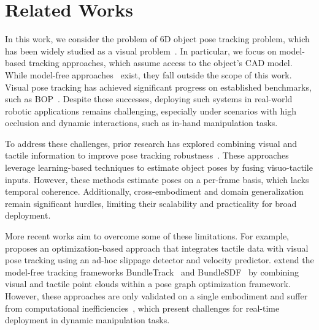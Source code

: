 \section{Related Works}
In this work, we consider the problem of 6D object pose tracking problem, which has been widely studied as a visual problem~\cite{wen_se3-tracknet_2020, li_deepim_2018, wen_foundationpose_2024, deng_poserbpf_2021}.
In particular, we focus on model-based tracking approaches, which assume access to the object's CAD model. 
While model-free approaches~\cite{wen_bundletrack_2021, wen_bundlesdf_2023, suresh_neuralfeels_2024} exist, they fall outside the scope of this work.
Visual pose tracking has achieved significant progress on established benchmarks, such as BOP~\cite{hodan_bop_2024}.
Despite these successes, deploying such systems in real-world robotic applications remains challenging, especially under scenarios with high occlusion and dynamic interactions, such as in-hand manipulation tasks.

To address these challenges, prior research has explored combining visual and tactile information to improve pose tracking robustness~\cite{li_vihope_2023, suresh_neuralfeels_2024, dikhale_visuotactile_2022, wan_vint-6d_2024, rezazadeh_hierarchical_2023, tu_posefusion_2023, gao_-hand_2023, li_hypertaxel_2024}.
These approaches leverage learning-based techniques to estimate object poses by fusing visuo-tactile inputs. 
However, these methods estimate poses on a per-frame basis, which lacks temporal coherence. 
Additionally, cross-embodiment and domain generalization remain significant hurdles, limiting their scalability and practicality for broad deployment.

More recent works aim to overcome some of these limitations. 
For example, \citet{liu_enhancing_2024} proposes an optimization-based approach that integrates tactile data with visual pose tracking using an ad-hoc slippage detector and velocity predictor. 
\citet{suresh_neuralfeels_2024} extend the model-free tracking frameworks BundleTrack~\cite{wen_bundletrack_2021} and BundleSDF~\cite{wen_bundlesdf_2023} by combining visual and tactile point clouds within a pose graph optimization framework. 
However, these approaches are only validated on a single embodiment and suffer from computational inefficiencies~\cite{suresh_neuralfeels_2024}, which present challenges for real-time deployment in dynamic manipulation tasks.
